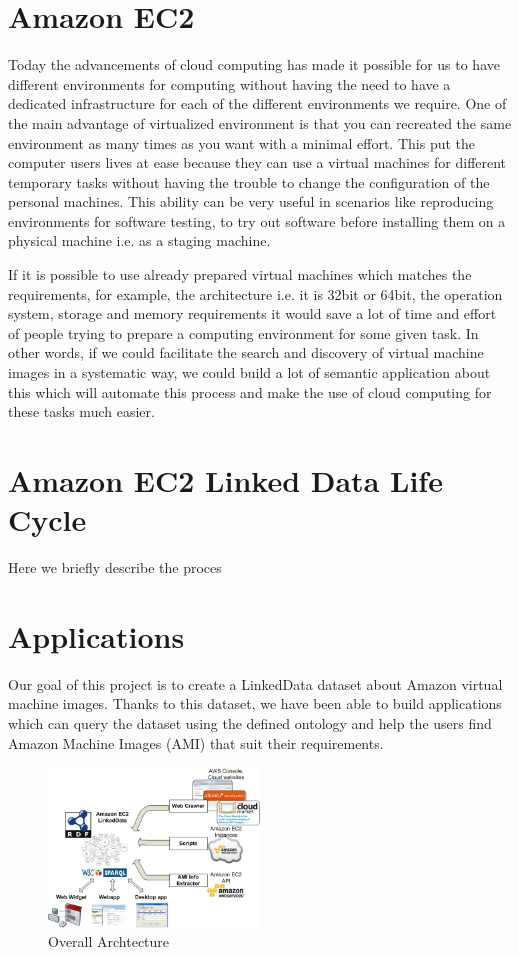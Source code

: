 \section{Amazon EC2}

Today the advancements of cloud computing has made it possible for us to have different environments for computing without having the need to have a dedicated infrastructure for each of the different environments we require.  One of the main advantage of virtualized environment is that you can recreated the same environment as many times as you want with a minimal effort. This put the computer users lives at ease because they can use a virtual machines for different temporary tasks without having the trouble to change the configuration of the personal machines. This ability can be very useful in scenarios like reproducing environments for software testing, to try out software before installing them on a physical machine i.e. as a staging machine. 

If it is possible to use already prepared virtual machines which matches the requirements, for example, the architecture i.e. it is 32bit or 64bit, the operation system, storage and memory requirements it would save a lot of time and effort of people trying to prepare a computing environment for some given task. In other words, if we could facilitate the search and discovery of virtual machine images in a systematic way, we could build a lot of semantic application about this which will automate this process and make the use of cloud computing for these tasks much easier. 


\section{Amazon EC2 Linked Data Life Cycle}
Here we briefly describe the proces

\section{Applications}
Our goal of this project is to create a LinkedData dataset about Amazon virtual machine images. Thanks to this dataset, we have been able to build applications which can query the dataset using the defined ontology and help the users find Amazon Machine Images (AMI) that suit their requirements. 

\begin{figure}[ht!]
  \caption{Overall Archtecture}
  \centering
    \includegraphics[width=0.5\textwidth]{EC2LD.jpg}
\end{figure}

